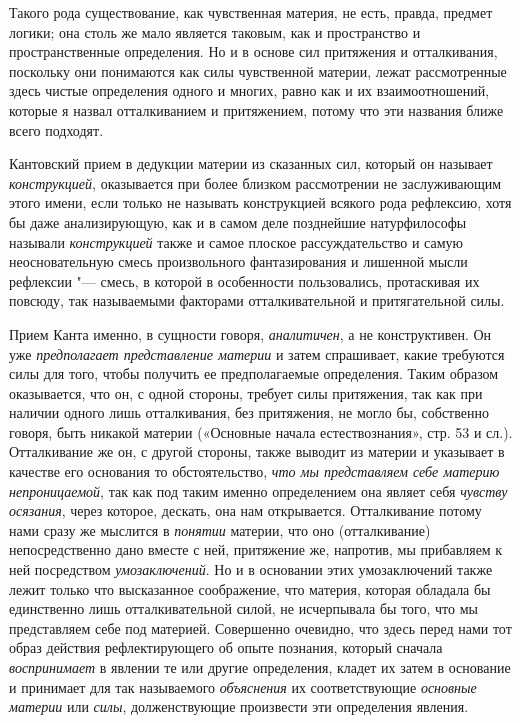 Такого рода существование, как чувственная материя, не есть, правда, предмет
логики; она столь же мало является таковым, как и пространство и
пространственные определения. Но и в основе сил притяжения и отталкивания,
поскольку они понимаются как силы чувственной материи, лежат рассмотренные
здесь чистые определения одного и многих, равно как и их взаимоотношений,
которые я назвал отталкиванием и притяжением, потому что эти названия ближе
всего подходят.

Кантовский прием в дедукции материи из сказанных сил, который он называет
{\em конструкцией}, оказывается при более близком
рассмотрении не заслуживающим этого имени, если только не называть
конструкцией всякого рода рефлексию, хотя бы даже анализирующую, как и в
самом деле позднейшие натурфилософы называли
{\em конструкцией} также и самое плоское
рассуждательство и самую неосновательную смесь произвольного фантазирования
и лишенной мысли рефлексии "--- смесь, в которой в особенности пользовались,
протаскивая их повсюду, так называемыми факторами отталкивательной и
притягательной силы.

Прием Канта именно, в сущности говоря, {\em аналитичен},
а не конструктивен. Он уже {\em предполагает
представление материи} и затем спрашивает, какие требуются силы для того,
чтобы получить ее предполагаемые определения. Таким образом оказывается,
что он, с одной стороны, требует силы притяжения, так как при наличии
одного лишь отталкивания, без притяжения, не могло бы, собственно говоря,
быть никакой материи («Основные начала естествознания», стр. 53 и сл.).
Отталкивание же он, с другой стороны, также выводит из материи и указывает
в качестве его основания то обстоятельство, {\em что мы
представляем себе материю непроницаемой}, так как под таким именно
определением она являет себя {\em чувству осязания},
через которое, дескать, она нам открывается. Отталкивание потому нами сразу
же мыслится в {\em понятии} материи, что оно
(отталкивание) непосредственно дано вместе с ней, притяжение же, напротив,
мы прибавляем к ней посредством {\em умозаключений}. Но
и в основании этих умозаключений также лежит только что высказанное
соображение, что материя, которая обладала бы единственно лишь
отталкивательной силой, не исчерпывала бы того, что мы представляем себе
под материей. Совершенно очевидно, что здесь перед нами тот образ действия
рефлектирующего об опыте познания, который сначала
{\em воспринимает} в явлении те или другие определения,
кладет их затем в основание и принимает для так называемого
{\em объяснения} их соответствующие
{\em основные материи} или
{\em силы}, долженствующие произвести эти определения
явления.

